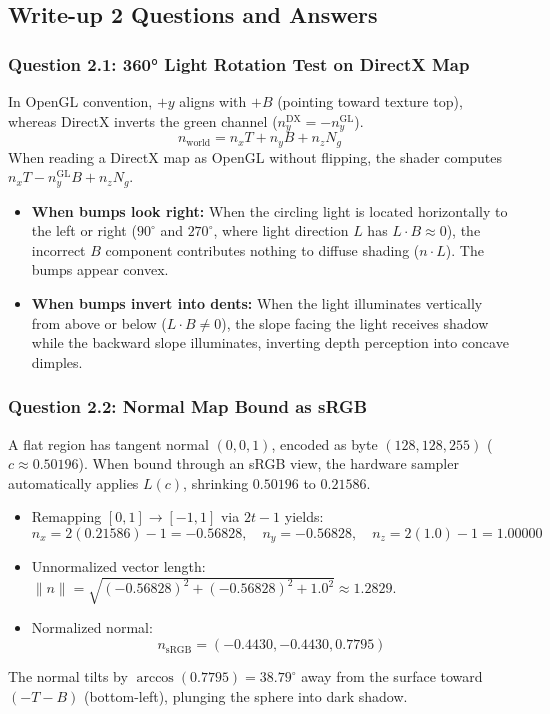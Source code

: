 \documentclass[10pt,a4paper]{article}
\begin{document}
\subsection{Write-up 2 Questions and Answers}

\subsubsection*{Question 2.1: 360° Light Rotation Test on DirectX Map}
In OpenGL convention, $+y$ aligns with $+B$ (pointing toward texture top), whereas DirectX inverts the green channel ($n_y^{\text{DX}} = -n_y^{\text{GL}}$).
\[
n_{\text{world}} = n_x T + n_y B + n_z N_g
\]
When reading a DirectX map as OpenGL without flipping, the shader computes $n_x T - n_y^{\text{GL}} B + n_z N_g$.
\begin{itemize}
    \item \textbf{When bumps look right:} When the circling light is located horizontally to the left or right ($90^\circ$ and $270^\circ$, where light direction $L$ has $L \cdot B \approx 0$), the incorrect $B$ component contributes nothing to diffuse shading ($n \cdot L$). The bumps appear convex.
    \item \textbf{When bumps invert into dents:} When the light illuminates vertically from above or below ($L \cdot B \ne 0$), the slope facing the light receives shadow while the backward slope illuminates, inverting depth perception into concave dimples.
\end{itemize}

\subsubsection*{Question 2.2: Normal Map Bound as sRGB}
A flat region has tangent normal $(0, 0, 1)$, encoded as byte $(128, 128, 255)$ ($c \approx 0.50196$). When bound through an sRGB view, the hardware sampler automatically applies $L(c)$, shrinking $0.50196$ to $0.21586$.
\begin{itemize}
    \item Remapping $[0, 1] \to [-1, 1]$ via $2t - 1$ yields:
    \[
    n_x = 2(0.21586) - 1 = -0.56828, \quad n_y = -0.56828, \quad n_z = 2(1.0) - 1 = 1.00000
    \]
    \item Unnormalized vector length: $\|n\| = \sqrt{(-0.56828)^2 + (-0.56828)^2 + 1.0^2} \approx 1.2829$.
    \item Normalized normal:
    \[
    n_{\text{sRGB}} = \mathbf{(-0.4430, -0.4430, 0.7795)}
    \]
\end{itemize}
The normal tilts by $\arccos(0.7795) = \mathbf{38.79^\circ}$ away from the surface toward $(-T - B)$ (bottom-left), plunging the sphere into dark shadow.
\end{document}
